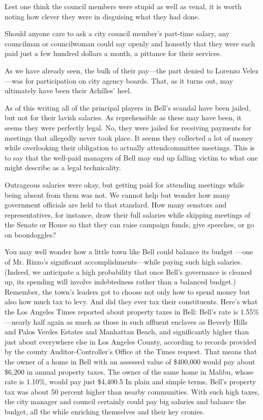 \documentclass[10pt]{article}
\begin{document}
{\large Lest one think the council members were stupid as well as venal, it is
worth noting how clever they were in disguising what they had done.}

{\large Should anyone care to ask a city council member's part-time salary, any
councilman or councilwoman could say openly and honestly that they were each paid
just a few hundred dollars a month, a pittance for their services.}

{\large As we have already seen, the bulk of their pay---the part denied to
Lorenzo Velez---was for participation on city agency boards. That, as it turns
out, may ultimately have been their Achilles' heel.}

{\large As of this writing all of the principal players in Bell's scandal have
been jailed, but not for their lavish salaries. As reprehensible as these may
have been, it seems they were perfectly legal. No, they were jailed for receiving
payments for meetings that allegedly never took place. It seems they collected a
lot of money while overlooking their obligation to actually attendcommittee
meetings. This is to say that the well-paid managers of Bell may end up falling
victim to what one might describe as a legal technicality.}

{\large Outrageous salaries were okay, but getting paid for attending meetings
while being absent from them was not. We cannot help but wonder how many
government officials are held to that standard. How many senators and
representatives, for instance, draw their full salaries while skipping meetings
of the Senate or House so that they can raise campaign funds, give speeches, or
go on boondoggles?}

{\large You may well wonder how a little town like Bell could balance its budget
---one of Mr. Rizzo's significant accomplishments---while paying such high
salaries. (Indeed, we anticipate a high probability that once Bell's governance
is cleaned up, its spending will involve indebtedness rather than a balanced
budget.) Remember, the town's leaders got to choose not only how to spend money
but also how much tax to levy. And did they ever tax their constituents. Here's
what the Los Angeles Times reported about property taxes in Bell: Bell's rate is
1.55\%---nearly half again as much as those in such affluent enclaves as Beverly
Hills and Palos Verdes Estates and Manhattan Beach, and significantly higher than
just about everywhere else in Los Angeles County, according to records provided
by the county Auditor-Controller's Office at the Times request. That means that
the owner of a home in Bell with an assessed value of \$400,000 would pay about
\$6,200 in annual property taxes. The owner of the same home in Malibu, whose
rate is 1.10\%, would pay just \$4,400.5 In plain and simple terms, Bell's
property tax was about 50 percent higher than nearby communities. With such high
taxes, the city manager and council certainly could pay big salaries and balance
the budget, all the while enriching themselves and their key cronies.}
\end{document}
